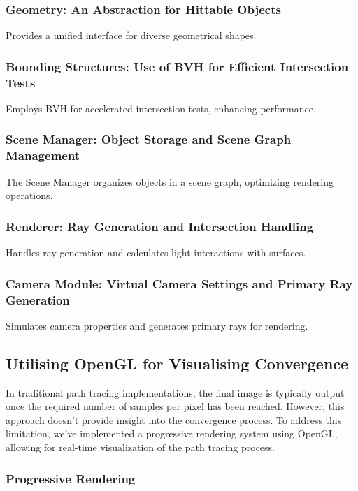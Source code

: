 \documentclass[12pt]{article}
\begin{document}
\subsubsection{Geometry: An Abstraction for Hittable Objects}
Provides a unified interface for diverse geometrical shapes.

\subsubsection{Bounding Structures: Use of BVH for Efficient Intersection Tests}
Employs BVH for accelerated intersection tests, enhancing performance.

\subsubsection{Scene Manager: Object Storage and Scene Graph Management}
The Scene Manager organizes objects in a scene graph, optimizing rendering operations.

\subsubsection{Renderer: Ray Generation and Intersection Handling}
Handles ray generation and calculates light interactions with surfaces.

\subsubsection{Camera Module: Virtual Camera Settings and Primary Ray Generation}
Simulates camera properties and generates primary rays for rendering.

\subsection{Utilising OpenGL for Visualising Convergence}

In traditional path tracing implementations, the final image is typically output once the required number of samples per pixel has been reached. However, this approach doesn't provide insight into the convergence process. To address this limitation, we've implemented a progressive rendering system using OpenGL, allowing for real-time visualization of the path tracing process.

\subsubsection{Progressive Rendering}
\end{document}
